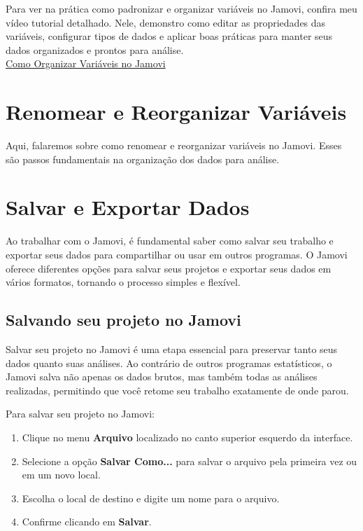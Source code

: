\begin{tcolorbox}[colback=white,colframe=red,title={\faPlayCircle \ Dica de Conteúdo}]
  Para ver na prática como padronizar e organizar variáveis no Jamovi, confira meu vídeo tutorial detalhado. Nele, demonstro como editar as propriedades das variáveis, configurar tipos de dados e aplicar boas práticas para manter seus dados organizados e prontos para análise.\\
  \textcolor{red}{\faYoutube} \href{https://youtu.be/PJkwPRLT_Q4?si=Ks8_3O7Ok5f-c6Bn}{Como Organizar Variáveis no Jamovi}
\end{tcolorbox}

\section{Renomear e Reorganizar Variáveis}
Aqui, falaremos sobre como renomear e reorganizar variáveis no Jamovi. Esses são passos fundamentais na organização dos dados para análise.

\section{Salvar e Exportar Dados}

Ao trabalhar com o Jamovi, é fundamental saber como salvar seu trabalho e exportar seus dados para compartilhar ou usar em outros programas. O Jamovi oferece diferentes opções para salvar seus projetos e exportar seus dados em vários formatos, tornando o processo simples e flexível.

\subsection{Salvando seu projeto no Jamovi}

Salvar seu projeto no Jamovi é uma etapa essencial para preservar tanto seus dados quanto suas análises. Ao contrário de outros programas estatísticos, o Jamovi salva não apenas os dados brutos, mas também todas as análises realizadas, permitindo que você retome seu trabalho exatamente de onde parou.

Para salvar seu projeto no Jamovi:

\begin{enumerate}
    \item Clique no menu \textbf{Arquivo} localizado no canto superior esquerdo da interface.
    \item Selecione a opção \textbf{Salvar Como...} para salvar o arquivo pela primeira vez ou em um novo local.
    \item Escolha o local de destino e digite um nome para o arquivo.
    \item Confirme clicando em \textbf{Salvar}.
\end{enumerate}

